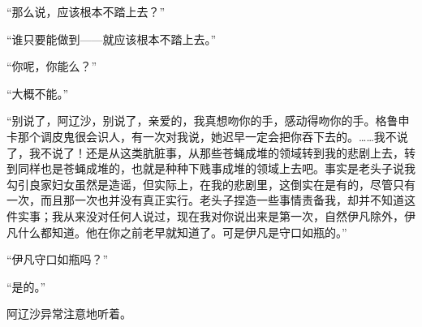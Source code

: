 \par “那么说，应该根本不踏上去？”
\par “谁只要能做到——就应该根本不踏上去。”
\par “你呢，你能么？”
\par “大概不能。”
\par “别说了，阿辽沙，别说了，亲爱的，我真想吻你的手，感动得吻你的手。格鲁申卡那个调皮鬼很会识人，有一次对我说，她迟早一定会把你吞下去的。……我不说了，我不说了！还是从这类肮脏事，从那些苍蝇成堆的领域转到我的悲剧上去，转到同样也是苍蝇成堆的，也就是种种下贱事成堆的领域上去吧。事实是老头子说我勾引良家妇女虽然是造谣，但实际上，在我的悲剧里，这倒实在是有的，尽管只有一次，而且那一次也并没有真正实行。老头子捏造一些事情责备我，却并不知道这件实事；我从来没对任何人说过，现在我对你说出来是第一次，自然伊凡除外，伊凡什么都知道。他在你之前老早就知道了。可是伊凡是守口如瓶的。”
\par “伊凡守口如瓶吗？”
\par “是的。”
\par 阿辽沙异常注意地听着。
